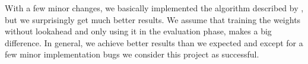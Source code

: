 \documentclass{ml}
\begin{document}
With a few minor changes, we basically implemented the algorithm described by \cite{zucker2009learning}, but we surprisingly get much better results. 
We assume that training the weights without lookahead and only using it in the evaluation phase, makes a big difference. 
In general, we achieve better results than we expected and except for a few minor implementation bugs we consider this project as successful.


\newpage

%

\end{document}
